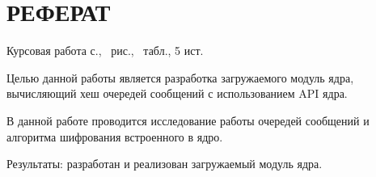 \section*{\large РЕФЕРАТ}

Курсовая работа \pageref{LastPage} с., \totalfigures\ рис., \totaltables\ табл., 5 ист.


Целью данной работы является разработка загружаемого модуль ядра, вычисляющий хеш очередей сообщений с использованием API ядра.

В данной работе проводится исследование работы очередей сообщений и алгоритма шифрования встроенного в ядро.

Результаты: разработан и реализован загружаемый модуль ядра.


\pagebreak